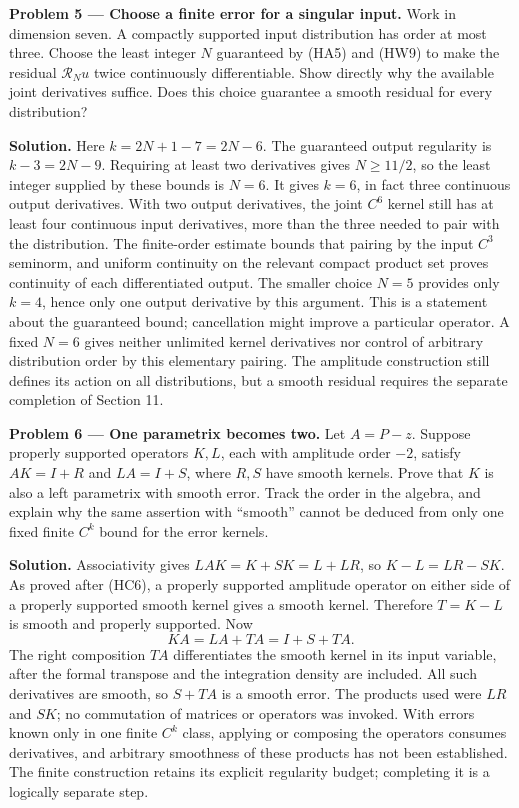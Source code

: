 \documentclass[
  11pt,
]{article}
\begin{document}
\textbf{Problem 5 --- Choose a finite error for a singular input.} Work
in dimension seven. A compactly supported input distribution has order
at most three. Choose the least integer \(N\) guaranteed by (HA5) and
(HW9) to make the residual \(\mathcal R_Nu\) twice continuously
differentiable. Show directly why the available joint derivatives
suffice. Does this choice guarantee a smooth residual for every
distribution?

\textbf{Solution.} Here \(k=2N+1-7=2N-6\). The guaranteed output
regularity is \(k-3=2N-9\). Requiring at least two derivatives gives
\(N\geq11/2\), so the least integer supplied by these bounds is \(N=6\).
It gives \(k=6\), in fact three continuous output derivatives. With two
output derivatives, the joint \(C^6\) kernel still has at least four
continuous input derivatives, more than the three needed to pair with
the distribution. The finite-order estimate bounds that pairing by the
input \(C^3\) seminorm, and uniform continuity on the relevant compact
product set proves continuity of each differentiated output. The smaller
choice \(N=5\) provides only \(k=4\), hence only one output derivative
by this argument. This is a statement about the guaranteed bound;
cancellation might improve a particular operator. A fixed \(N=6\) gives
neither unlimited kernel derivatives nor control of arbitrary
distribution order by this elementary pairing. The amplitude
construction still defines its action on all distributions, but a smooth
residual requires the separate completion of Section 11.

\textbf{Problem 6 --- One parametrix becomes two.} Let \(A=P-z\).
Suppose properly supported operators \(K,L\), each with amplitude order
\(-2\), satisfy \(AK=I+R\) and \(LA=I+S\), where \(R,S\) have smooth
kernels. Prove that \(K\) is also a left parametrix with smooth error.
Track the order in the algebra, and explain why the same assertion with
``smooth'' cannot be deduced from only one fixed finite \(C^k\) bound
for the error kernels.

\textbf{Solution.} Associativity gives \(LAK=K+SK=L+LR\), so
\(K-L=LR-SK\). As proved after (HC6), a properly supported amplitude
operator on either side of a properly supported smooth kernel gives a
smooth kernel. Therefore \(T=K-L\) is smooth and properly supported. Now
\[
                         KA=LA+TA=I+S+TA.                    \tag{HP6}
\] The right composition \(TA\) differentiates the smooth kernel in its
input variable, after the formal transpose and the integration density
are included. All such derivatives are smooth, so \(S+TA\) is a smooth
error. The products used were \(LR\) and \(SK\); no commutation of
matrices or operators was invoked. With errors known only in one finite
\(C^k\) class, applying or composing the operators consumes derivatives,
and arbitrary smoothness of these products has not been established. The
finite construction retains its explicit regularity budget; completing
it is a logically separate step.
\end{document}
